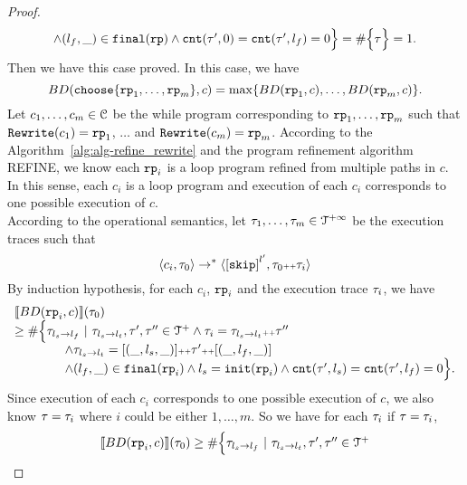 \begin{proof}
\[\begin{array}{l}
    \land (l_{f}, \_) \in \mathtt{final}(\mathtt{rp})
    \land \mathtt{cnt}(\mathtt{\tau}', 0) = \mathtt{cnt}(\mathtt{\tau}', l_f) = 0 
    \Big\}
     = \# \Big\{\mathtt{\tau} \Big\} = 1.
  \end{array}
\]
Then we have this case proved.
In this case, we have
\[
  BD(\rpchoose{\rprog_1, \ldots, \rprog_m }, c) = \max\left\{ BD(\rprog_1, c), \ldots, BD(\rprog_m, c) \right\}.
\]
Let $c_1, \ldots, c_m \in \mathcal{C}$ be the while program corresponding to $\mathtt{rp}_1, \ldots, \mathtt{rp}_m$ such that $\mathtt{Rewrite}(c_1) = \mathtt{rp}_1$, $\ldots$ and  $\mathtt{Rewrite}(c_m) = \mathtt{rp}_m$.
According to the Algorithm~\ref{alg:alg-refine_rewrite} and the program refinement algorithm REFINE, we know each $\mathtt{rp}_i$ is a loop program refined from multiple paths in $c$.
\\
In this sense, each $c_i$ is a loop program and execution of each $c_i$ corresponds to one possible execution of $c$.
\\
According to the operational semantics, let $\mathtt{\tau}_1, \ldots, \mathtt{\tau}_m \in \mathcal{T}^{+\infty}$ be the execution traces such that 
\[
  \config{c_i, \trace_0} \to^* 
  \config{\clabel{\eskip}^{l'}, \trace_0 \tracecat \trace_i}
\]
By induction hypothesis, for each $c_i$, $\mathtt{rp}_i$ and the execution trace $\mathtt{\tau}_i$, we have 
\[
  \begin{array}{l}
  \llbracket BD(\mathtt{rp}_i, c) \rrbracket(\mathtt{\tau}_0) 
  \\ \geq
  \# \Big\{\mathtt{\tau}_{l_s \to l_f} ~\vert~ \mathtt{\tau}_{l_s \to l_t}, \mathtt{\tau}', \mathtt{\tau}''\in \mathcal{T}^{+}
  \land \mathtt{\tau}_i = \mathtt{\tau}_{l_s \to l_t} {\scriptscriptstyle ++} \mathtt{\tau}''
  \\ \qquad \qquad
  \land \mathtt{\tau}_{l_s \to l_t} = [(\_, l_s, \_)] {\scriptscriptstyle ++} \mathtt{\tau}' {\scriptscriptstyle ++} [(\_, l_f, \_)]
  \\ \qquad \qquad
  \land (l_{f}, \_) \in \mathtt{final}(\mathtt{rp}_i)
  \land l_s = \mathtt{init}(\mathtt{rp}_i)
  \land \mathtt{cnt}(\mathtt{\tau}', l_s) = \mathtt{cnt}(\mathtt{\tau}', l_f) = 0 
  \Big\}.
  \end{array}
\]
Since execution of each $c_i$ corresponds to one possible execution of $c$, we also know
$\mathtt{\tau} = \mathtt{\tau}_i$ where $i$ could be either $1, \ldots, m$.
So we have for each $\mathtt{\tau}_i$ if $\mathtt{\tau} = \mathtt{\tau}_i$, 
\[
  \begin{array}{l}
    \llbracket BD(\mathtt{rp}_i, c) \rrbracket(\mathtt{\tau}_0) \geq
    \# \Big\{\mathtt{\tau}_{l_s \to l_f} ~\vert~ \mathtt{\tau}_{l_s \to l_t}, \mathtt{\tau}', \mathtt{\tau}''\in \mathcal{T}^{+}

\end{array}\]
\end{proof}
